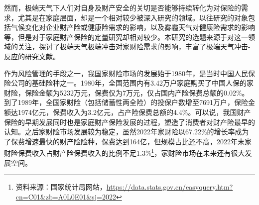 然而，极端天气下人们对自身及财产安全的关切是否能够持续转化为对保险的需求，尤其是在家庭层面，却是一个相对较少被深入研究的领域。以往研究的对象包括气候变化对企业财产险\citep{杨娜娜2019自然灾害与企业现金持有}或健康险\citep{赵强2021空气污染对商业健康保险需求的影响}需求的影响，以及雾霾天气对健康险需求的影响\citep{2018Something}等，但是对于家庭财产保险的定量研究却相对较少。本研究的选题来源于对这一领域的关注，探讨了极端天气极端冲击对家财险需求的影响，丰富了极端天气冲击-反应的研究文献。

作为风险管理的手段之一，我国家财险市场的发展始于1980年，是当时中国人民保险公司的基础险种之一。1980年，全国范围内有3.42万户家庭购买了中国人保的家财险，保险金额为5232万元，保费仅为7万元，仅占国内产险保费总额的0.02\%。到了1989年，全国家财险（包括储蓄性两全险）的投保户数增至7691万户，保险金额达1974亿元，保费收入为3.2亿元，占产险保费总额的4.4\%。可以说，我国财产保险的早期发展同时也是家庭财产保险发展的过程\citep{黄英君2008论我国产险公司分散性业务营销模式的创新}，塑造了消费者对财产险最早的认知。之后家财险市场发展较为稳定，虽然2022年家财险以67.22\%的增长率成为了保费增速最快的财产险险种，保费达到164亿，但规模占比还不高，2022年末家财险保费收入占财产险保费收入的比例不足1.3\%\footnote{资料来源：国家统计局网站，\url{https://data.stats.gov.cn/easyquery.htm?cn=C01&zb=A0L0E01&sj=2022}}，家财险市场在未来还有很大发展空间。
